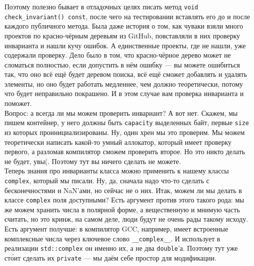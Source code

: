 \documentclass{article}
\begin{document}
    Поэтому полезно бывает в отладочных целях писать метод \texttt{void check_invariant() const}, после чего на тестировании вставлять его до и после каждого публичного метода. Была даже история о том, как чуваки взяли много проектов по красно-чёрным деревьям из GitHub, повставляли в них проверку инварианта и нашли кучу ошибок. А единственные проекты, где не нашли, уже содержали проверку. Дело было в том, что красно-чёрное дерево может не сломаться полностью, если допустить в нём ошибку --- вы можете ошибиться так, что оно всё ещё будет деревом поиска, всё ещё сможет добавлять и удалять элементы, но оно будет работать медленнее, чем должно теоретически, потому что будет неправильно покрашено. И в этом случае вам проверка инварианта и поможет.\\
    Вопрос: а всегда ли мы можем проверить инвариант? А вот нет. Скажем, мы пишем контейнер, у него должны быть \texttt{capacity} выделенных байт, первые \texttt{size} из которых проинициализированы. Ну, один хрен мы это проверим. Мы можем теоретически написать какой-то умный аллокатор, который имеет проверку первого, а разломав компилятор сможем проверить второе. Но это никто делать не будет, увы(. Поэтому тут вы ничего сделать не можете.\\
    Теперь знания про инварианты класса можно применить к нашему классы \texttt{complex}, который мы писали. Ну, да, сначала надо что-то сделать с бесконечностями и NaN'ами, но сейчас не о них. Итак, можем ли мы делать в классе \texttt{complex} поля доступными? Есть аргумент против этого такого рода: мы же можем хранить числа в полярной форме, а вещественную и мнимую часть считать, но это кринж, на самом деле, люди будут не очень рады такому исходу. Есть аргумент получше: в компилятор GCC, например, имеет встроенные комплексные числа через ключевое слово \texttt{__complex__}. И использует в реализации \texttt{std::complex} он именно их, а не два \texttt{double}'а. Поэтому тут уже ст\'{о}ит сделать их \texttt{private} --- мы даём себе простор для модификации.
\end{document}
